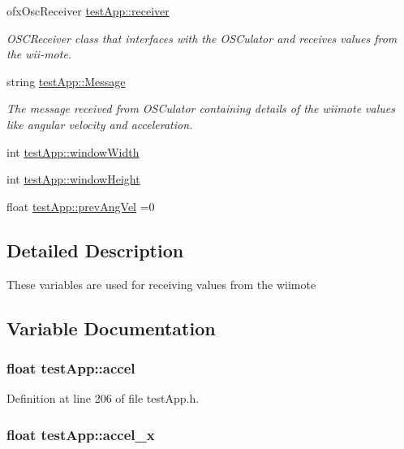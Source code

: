 \begin{DoxyCompactItemize}
ofx\-Osc\-Receiver \hyperlink{group___wii_mote_ga034c44ff60fa1e5f021e90d5410ba657}{test\-App\-::receiver}
\begin{DoxyCompactList}\small\item\em O\-S\-C\-Receiver class that interfaces with the O\-S\-Culator and receives values from the wii-\/mote. \end{DoxyCompactList}\item 
string \hyperlink{group___wii_mote_ga0124035d0454fb6bd9152f8a87c40677}{test\-App\-::\-Message}
\begin{DoxyCompactList}\small\item\em The message received from O\-S\-Culator containing details of the wiimote values like angular velocity and acceleration. \end{DoxyCompactList}\item 
int \hyperlink{group___wii_mote_ga9ed611377cd46f5148a3a3d538e96484}{test\-App\-::window\-Width}
\item 
int \hyperlink{group___wii_mote_ga4e8884eeef5b2657b62278969d4e3dcf}{test\-App\-::window\-Height}
\item 
float \hyperlink{group___wii_mote_ga8a2b9b9cf76097e20f148b616297029b}{test\-App\-::prev\-Ang\-Vel} =0
\end{DoxyCompactItemize}


\subsection{Detailed Description}
These variables are used for receiving values from the wiimote 

\subsection{Variable Documentation}
\hypertarget{group___wii_mote_ga8e560e923c82d421857538e4a5927542}{
\subsubsection[{accel}]{\setlength{\rightskip}{0pt plus 5cm}float test\-App\-::accel}}\label{group___wii_mote_ga8e560e923c82d421857538e4a5927542}


Definition at line 206 of file test\-App.\-h.

\hypertarget{group___wii_mote_gad1738ff98d225f80b853a9ddc9f5a116}{
\subsubsection[{accel\-\_\-x}]{\setlength{\rightskip}{0pt plus 5cm}float test\-App\-::accel\-\_\-x}}\label{group___wii_mote_gad1738ff98d225f80b853a9ddc9f5a116}


